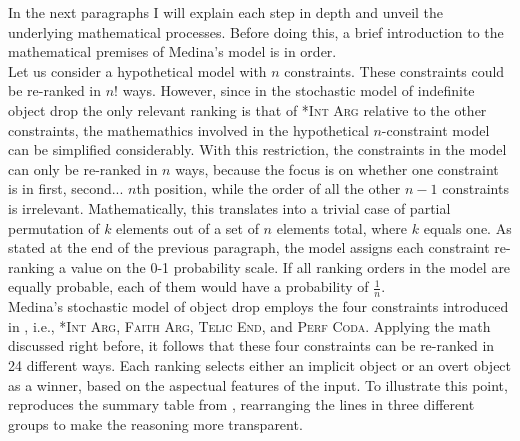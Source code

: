 In the next paragraphs I will explain each step in depth and unveil the underlying mathematical processes. Before doing this, a brief introduction to the mathematical premises of Medina's model is in order.\\
Let us consider a hypothetical model with $n$ constraints. These constraints could be re-ranked in $n!$ ways. However, since in the stochastic model of indefinite object drop the only relevant ranking is that of \textsc{*Int Arg} relative to the other constraints, the mathemathics involved in the hypothetical $n$-constraint model can be simplified considerably. With this restriction, the constraints in the model can only be re-ranked in $n$ ways, because the focus is on whether one constraint is in first, second... $n$th position, while the order of all the other $n-1$ constraints is irrelevant. Mathematically, this translates into a trivial case of partial permutation of $k$ elements out of a set of $n$ elements total, where $k$ equals one. As stated at the end of the previous paragraph, the model assigns each constraint re-ranking a value on the 0-1 probability scale. If all ranking orders in the model are equally probable, each of them would have a probability of $\frac{1}{n}$.\\
Medina's stochastic model of object drop employs the four constraints introduced in , i.e., \textsc{*Int Arg}, \textsc{Faith Arg}, \textsc{Telic End}, and \textsc{Perf Coda}. Applying the math discussed right before, it follows that these four constraints can be re-ranked in 24 different ways. Each ranking selects either an implicit object or an overt object as a winner, based on the aspectual features of the input. To illustrate this point,  reproduces the summary table from \textcite[89]{Medina2007}, rearranging the lines in three different groups to make the reasoning more transparent.

